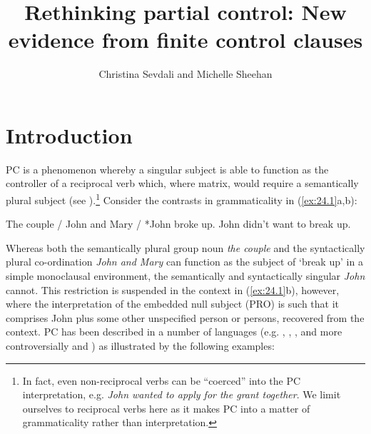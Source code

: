 \documentclass[output=paper]{langsci/langscibook}
\author{Christina Sevdali\affiliation{Ulster University} and Michelle Sheehan\affiliation{Anglia Ruskin University}}
\title{Rethinking partial control: New evidence from finite control clauses}
\begin{document}
\glsresetall
\maketitle

\section{Introduction}\label{sec:24.1}

\Gls{PC} is a
phenomenon whereby a singular subject is able to function as the controller of
a reciprocal verb which, where matrix, would require a semantically plural
subject (see \citealt{Landau2000}).\footnote{In fact, even non-reciprocal verbs
    can be “coerced” into the \gls{PC}
    interpretation, e.g. \textit{John wanted to apply for the grant together}. We limit
    ourselves to reciprocal verbs here as it makes \gls{PC} into a matter of grammaticality rather than interpretation.} Consider
the contrasts in grammaticality in (\ref{ex:24.1}a,b):

\ea\label{ex:24.1}
	\ea The couple / John and Mary / *John broke up.
	\ex John didn’t want to break up.
	\z
\z

Whereas both the semantically plural group noun \emph{the couple} and the
syntactically plural co-ordination \emph{John and Mary} can function as the
subject of ‘break up’ in a simple monoclausal environment, the semantically and
syntactically singular \emph{John} cannot. This restriction is suspended in
the  context in (\ref{ex:24.1}b), however, where the interpretation of the embedded
null subject (PRO) is such that it comprises John plus some other unspecified
person or persons, recovered from the context. \gls{PC} has been described in a number of languages (e.g. ,
, ,  and more
controversially  and ) as
illustrated by the following examples:
\end{document}
